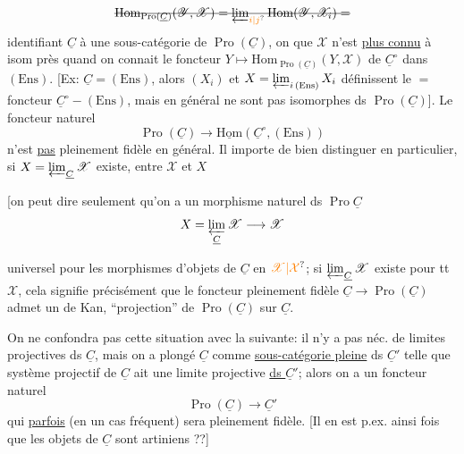 \[
\deleted{\mathrm{Hom}_{\operatorname{Pro}(\underline C)}(\mathscr Y,\mathscr X)=\varprojlim_{\unsure{i|j}}\mathrm{Hom}(\mathscr Y,\mathscr X_i)=}
\]
identifiant $\underline C$ à une sous-catégorie de $\operatorname{Pro}(\underline C)$, on  que $\mathscr X$ n'est \uline{plus connu} à isom près quand on connait le foncteur $Y\mapsto\mathrm{Hom}_{\operatorname{Pro}(\underline C)}(Y,\mathscr X)$ de $\underline C^\circ$ dans $(\mathrm{Ens})$. [Ex: $\underline C=(\mathrm{Ens})$, alors $(X_i)$ et $X=\varprojlim_{i\,(\mathrm{Ens})}X_i$ définissent le $=$ foncteur $\underline C^\circ\mathbin{-}(\mathrm{Ens})$, mais en général ne sont pas isomorphes ds $\operatorname{Pro}(\underline C)$]. Le foncteur naturel
\[
\operatorname{Pro}(\underline C)\longrightarrow\underline{\mathrm{Hom}}(\underline C^\circ,(\mathrm{Ens}))
\]
n'est  \uline{pas} pleinement fidèle en général. Il importe de bien distinguer en particulier, si $X=\varprojlim_{\underline C}\mathscr X$ existe, entre $\mathscr X$ et $X$

[on peut dire seulement qu'on a un morphisme naturel ds $\operatorname{Pro}\underline C$
\[
X=\varprojlim_{\underline C}\mathscr X\longrightarrow\mathscr X
\]

universel pour les morphismes d'objets de $\underline C$ en $\unsure{\mathscr X|\mathcal X}$; si $\varprojlim_{\underline C}\mathscr X$ existe pour tt $\mathscr X$, cela signifie précisément que le foncteur  pleinement fidèle $\underline C\longrightarrow\operatorname{Pro}(\underline C)$ admet un  de Kan, ``projection'' de $\operatorname{Pro}(\underline C)$  sur $\underline C$.

On ne confondra pas cette situation avec la suivante:  il n'y a pas néc. de limites projectives ds $\underline C$, mais on a plongé $\underline C$ comme \uline{sous-catégorie pleine} ds $\underline C'$ telle que  système projectif de $\underline C$ ait une limite projective \uline{ds $\underline C'$}; alors on a un foncteur naturel
\[
\operatorname{Pro}(\underline C)\longrightarrow\underline C'
\]
qui \uline{parfois}  (en un cas fréquent) sera pleinement fidèle. [Il en est p.ex. ainsi  fois que les objets de $\underline C$ sont artiniens ??]


